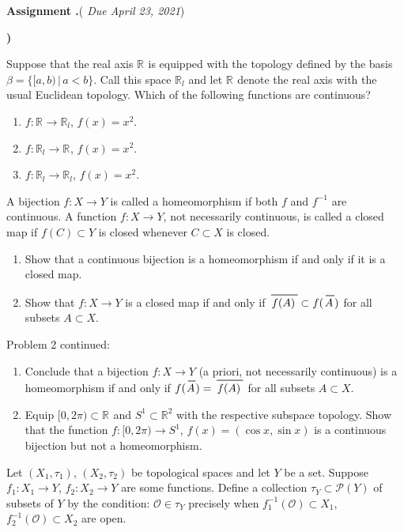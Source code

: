 \documentclass[12pt,reqno]{amsart}
\newcounter{assign}
\newenvironment{assignment}{\par\noindent\textbf{Assignment \Roman{assign}.\hskip2pt}}{\par\vskip12pt\stepcounter{assign}}
\theoremstyle{plain}
\theoremstyle{definition}
\newcommand{\R}[1]{\mathbb{R}^{#1}}
\newcommand\closure[2]{\overset{\raisebox{0.6pt}{\hspace{0.2em}\text{\rule{#1}{0.2mm}}}}{#2}}
\begin{document}
\begin{assignment}({\em{\color{duecolor} Due April 23, 2021}})
\begin{list}{\textbf{)}}{\setlength{\itemsep}{2pt}\setlength{\leftmargin}{15pt}\setlength{\parsep}{0pt}}
\item Suppose that the real axis $\R{}$ is equipped with the topology defined by the basis $\beta=\{[a,b)\,\vert\,a<b\}$. Call this space $\R{}_l$ and let $\R{}$ denote the real axis with the usual Euclidean topology. Which of the following functions  are continuous?
\begin{enumerate}[label=\textbf{\alph*})]
\item $f\colon \R{}\to\R{}_l$, $f(x)=x^2$.
\item $f\colon \R{}_l\to\R{}$, $f(x)=x^2$.
\item $f\colon \R{}_l\to\R{}_l$, $f(x)=x^2$.
\end{enumerate}
\item A bijection $f\colon X\to Y$ is called a homeomorphism if both $f$ and $f^{-1}$ are continuous. A function $f\colon X\to Y$, not necessarily continuous, is called a closed map if $f(C)\subset Y$ is closed whenever $C\subset X$ is closed.
\begin{enumerate}[label=\textbf{\alph*})]
\item Show that a continuous bijection is a homeomorphism if and only if it is a closed map.
\item Show that $f\colon X\to Y$ is a closed map if and only if $\closure{24pt}{f(A)}\subset f(\closure{8pt}{A})$ for all subsets $A\subset X$. 
\end{enumerate}
\item Problem 2 continued:
\begin{enumerate}[label=\textbf{\alph*})]
\item Conclude that a bijection $f\colon X\to Y$ (a priori, not necessarily continuous) is a homeomorphism if and only if $f(\closure{7pt}{A})=\closure{24pt}{f(A)}$ for all subsets $A\subset X$.
\item Equip $[0,2\pi)\subset\R{}$ and $S^1\subset \R2$ with the respective subspace topology. Show that the function $f\colon [0,2\pi)\to S^1$, $f(x)=(\cos x,\sin x)$ is a continuous bijection but not a homeomorphism.
\end{enumerate}
\item Let $(X_1,\tau_1)$, $(X_2,\tau_2)$ be topological spaces and let $Y$ be a set. Suppose $f_1\colon X_1\to Y$, $f_2\colon X_2\to Y$ are some functions. Define a collection $\tau_Y\subset\mathcal P(Y)$ of subsets of $Y$ by the condition: $\mathcal O\in\tau_Y$ precisely when $f_1^{-1}(\mathcal O)\subset X_1$, $f_2^{-1}(\mathcal O)\subset X_2$ are open.

\end{list}
\end{assignment}
\end{document}
